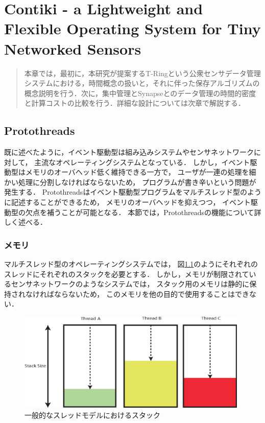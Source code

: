 \chapter{Contiki - a Lightweight and Flexible Operating System for Tiny Networked Sensors}
\begin{large}
\begin{quote}
本章では，最初に，本研究が提案するT-Ringという公衆センサデータ管理システムにおける，時間概念の扱いと，それに伴った保存アルゴリズムの概念説明を行う．次に，集中管理とSynapseとのデータ管理の時間的密度と計算コストの比較を行う．詳細な設計については次章で解説する．

\end{quote}
\end{large}
\clearpage

\section{Protothreads}
既に述べたように，イベント駆動型は組み込みシステムやセンサネットワークに対して，
主流なオペレーティングシステムとなっている．
しかし，イベント駆動型はメモリのオーバヘッド低く維持できる一方で，
ユーザが一連の処理を細かい処理に分割しなければならないため，
プログラムが書き辛いという問題が発生する．
Protothreads\cite{Dunkels:2006:PSE:1182807.1182811}はイベント駆動型プログラムをマルチスレッド型のように記述することができるため，
メモリのオーバヘッドを抑えつつ，
イベント駆動型の欠点を補うことが可能となる．
本節では，Protothreadsの機能について詳しく述べる．

\subsection{メモリ}
マルチスレッド型のオペレーティングシステムでは，
図\ref{fig:threads_stack}のようにそれぞれのスレッドにそれぞれのスタックを必要とする．
しかし，メモリが制限されているセンサネットワークのようなシステムでは，
スタック用のメモリは静的に保持されなければならないため，
このメモリを他の目的で使用することはできない．
\begin{figure}[htbp]
 \begin{center}
  \includegraphics[width=110mm]{./images/threads_stack.eps}
 \end{center}
 \caption{一般的なスレッドモデルにおけるスタック}
 \label{fig:threads_stack}
\end{figure}

